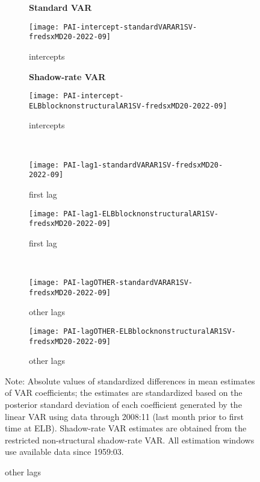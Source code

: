 \documentclass[12pt]{article}
\newlength{\picwid}
\begin{document}
\clearpage
\begin{figure}
\setlength{\picwid}{.4\textwidth}
\caption{Parameter changes over time}
\label{fig:PAIsinceGFC0}
\begin{center}
\begin{subfigure}[b]{\picwid}
\centering\textbf{Standard VAR}\vspace{0.5\baselineskip}
\caption{intercepts}
\label{subfig:pai:standard:intercepts}
\texttt{[image: PAI-intercept-standardVARAR1SV-fredsxMD20-2022-09]}
\end{subfigure}
\quad
\begin{subfigure}[b]{\picwid}
\centering\textbf{Shadow-rate VAR}\vspace{0.5\baselineskip}
\caption{intercepts}
\label{subfig:pai:nonstructural:intercepts}
\texttt{[image: PAI-intercept-ELBblocknonstructuralAR1SV-fredsxMD20-2022-09]}
\end{subfigure}
\\
\begin{subfigure}[b]{\picwid}
\caption{first lag}
\label{subfig:pai:standard:lag1}
\texttt{[image: PAI-lag1-standardVARAR1SV-fredsxMD20-2022-09]}
\end{subfigure}
\quad
\begin{subfigure}[b]{\picwid}
\caption{first lag}
\label{subfig:pai:nonstructural:lag1}
\texttt{[image: PAI-lag1-ELBblocknonstructuralAR1SV-fredsxMD20-2022-09]}
\end{subfigure}
\\
\begin{subfigure}[b]{\picwid}
\caption{other lags}
\label{subfig:pai:standard:lagother}
\texttt{[image: PAI-lagOTHER-standardVARAR1SV-fredsxMD20-2022-09]}
\end{subfigure}
\quad
\begin{subfigure}[b]{\picwid}
\caption{other lags}
\label{subfig:pai:nonstructural:lagother}
\texttt{[image: PAI-lagOTHER-ELBblocknonstructuralAR1SV-fredsxMD20-2022-09]}
\end{subfigure}
\end{center}
Note: Absolute values of standardized differences in mean estimates of VAR coefficients; the estimates are standardized based on the posterior standard deviation of each coefficient generated by the linear VAR using data through 2008:11 (last month prior to first time at ELB). Shadow-rate VAR estimates are obtained from the restricted non-structural shadow-rate VAR. All estimation windows use available data since 1959:03.
\end{figure}
\end{document}
